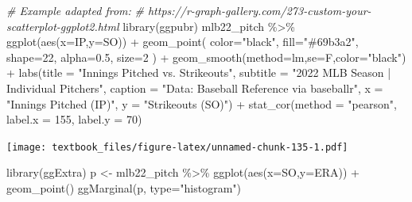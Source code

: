\documentclass[
  11pt,
]{book}
\newenvironment{Shaded}{\begin{snugshade}}{\end{snugshade}}
\newcommand{\AttributeTok}[1]{\textcolor[rgb]{0.77,0.63,0.00}{#1}}
\newcommand{\CommentTok}[1]{\textcolor[rgb]{0.56,0.35,0.01}{\textit{#1}}}
\newcommand{\DecValTok}[1]{\textcolor[rgb]{0.00,0.00,0.81}{#1}}
\newcommand{\FloatTok}[1]{\textcolor[rgb]{0.00,0.00,0.81}{#1}}
\newcommand{\FunctionTok}[1]{\textcolor[rgb]{0.00,0.00,0.00}{#1}}
\newcommand{\NormalTok}[1]{#1}
\newcommand{\OtherTok}[1]{\textcolor[rgb]{0.56,0.35,0.01}{#1}}
\newcommand{\SpecialCharTok}[1]{\textcolor[rgb]{0.00,0.00,0.00}{#1}}
\newcommand{\StringTok}[1]{\textcolor[rgb]{0.31,0.60,0.02}{#1}}
\theoremstyle{definition}
\theoremstyle{definition}
\theoremstyle{definition}
\theoremstyle{definition}
\theoremstyle{remark}
\begin{document}
\begin{Shaded}
\begin{Highlighting}[]
\CommentTok{\# Example adapted from: }
\CommentTok{\# https://r{-}graph{-}gallery.com/273{-}custom{-}your{-}scatterplot{-}ggplot2.html}
\FunctionTok{library}\NormalTok{(ggpubr)}
\NormalTok{mlb22\_pitch }\SpecialCharTok{\%\textgreater{}\%}
  \FunctionTok{ggplot}\NormalTok{(}\FunctionTok{aes}\NormalTok{(}\AttributeTok{x=}\NormalTok{IP,}\AttributeTok{y=}\NormalTok{SO)) }\SpecialCharTok{+}
  \FunctionTok{geom\_point}\NormalTok{(}
    \AttributeTok{color=}\StringTok{"black"}\NormalTok{,}
    \AttributeTok{fill=}\StringTok{"\#69b3a2"}\NormalTok{,}
    \AttributeTok{shape=}\DecValTok{22}\NormalTok{,}
    \AttributeTok{alpha=}\FloatTok{0.5}\NormalTok{,}
    \AttributeTok{size=}\DecValTok{2}
\NormalTok{  ) }\SpecialCharTok{+}
  \FunctionTok{geom\_smooth}\NormalTok{(}\AttributeTok{method=}\NormalTok{lm,}\AttributeTok{se=}\NormalTok{F,}\AttributeTok{color=}\StringTok{"black"}\NormalTok{) }\SpecialCharTok{+}
  \FunctionTok{labs}\NormalTok{(}\AttributeTok{title =} \StringTok{"Innings Pitched vs. Strikeouts"}\NormalTok{,}
       \AttributeTok{subtitle =} \StringTok{"2022 MLB Season | Individual Pitchers"}\NormalTok{,}
       \AttributeTok{caption =} \StringTok{"Data: Baseball Reference via baseballr"}\NormalTok{, }
       \AttributeTok{x =} \StringTok{"Innings Pitched (IP)"}\NormalTok{,}
       \AttributeTok{y =} \StringTok{"Strikeouts (SO)"}\NormalTok{) }\SpecialCharTok{+}
  \FunctionTok{stat\_cor}\NormalTok{(}\AttributeTok{method =} \StringTok{"pearson"}\NormalTok{, }\AttributeTok{label.x =} \DecValTok{155}\NormalTok{, }\AttributeTok{label.y =} \DecValTok{70}\NormalTok{)}
\end{Highlighting}
\end{Shaded}

\texttt{[image: textbook\_files/figure-latex/unnamed-chunk-135-1.pdf]}

\newpage

\begin{Shaded}
\begin{Highlighting}[]
\FunctionTok{library}\NormalTok{(ggExtra)}
\NormalTok{p }\OtherTok{\textless{}{-}}\NormalTok{ mlb22\_pitch }\SpecialCharTok{\%\textgreater{}\%}
  \FunctionTok{ggplot}\NormalTok{(}\FunctionTok{aes}\NormalTok{(}\AttributeTok{x=}\NormalTok{SO,}\AttributeTok{y=}\NormalTok{ERA)) }\SpecialCharTok{+}
  \FunctionTok{geom\_point}\NormalTok{()}
\FunctionTok{ggMarginal}\NormalTok{(p, }\AttributeTok{type=}\StringTok{"histogram"}\NormalTok{)}
\end{Highlighting}
\end{Shaded}
\end{document}
